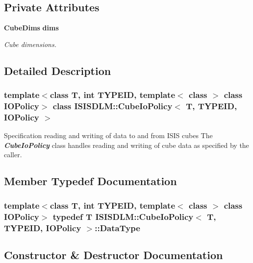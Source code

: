 \subsection*{Private Attributes}
\begin{CompactItemize}
\item 
{\bf Cube\-Dims} {\bf dims}
\begin{CompactList}\small\item\em Cube dimensions. \item\end{CompactList}\end{CompactItemize}


\subsection{Detailed Description}
\subsubsection*{template$<$class T, int TYPEID, template$<$ class $>$ class IOPolicy$>$ class ISISDLM::Cube\-Io\-Policy$<$ T, TYPEID, IOPolicy $>$}

Specification reading and writing of data to and from ISIS cubes The {\em {\bf Cube\-Io\-Policy}\/} class handles reading and writing of cube data as specified by the caller. 



\subsection{Member Typedef Documentation}
\subsubsection{\setlength{\rightskip}{0pt plus 5cm}template$<$class T, int TYPEID, template$<$ class $>$ class IOPolicy$>$ typedef T {\bf ISISDLM::Cube\-Io\-Policy}$<$ T, TYPEID, IOPolicy $>$::{\bf Data\-Type}}\label{classISISDLM_1_1CubeIoPolicy_w0}




\subsection{Constructor \& Destructor Documentation}
